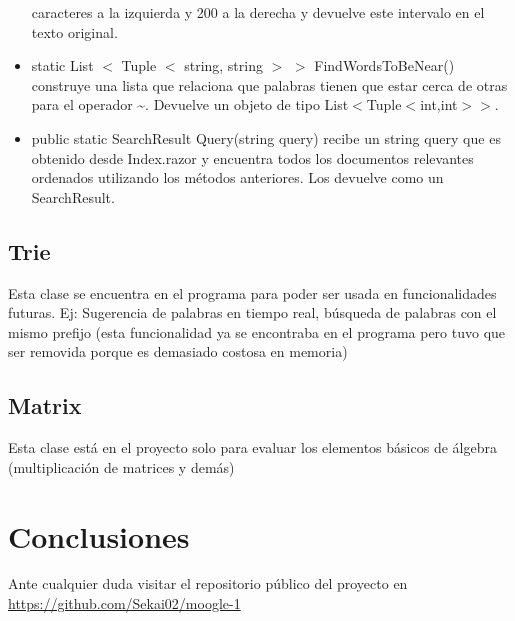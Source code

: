 \documentclass[a4paper,12pt]{article}
\begin{document}
\begin{itemize}
    caracteres a la izquierda y 200 a la derecha y devuelve este intervalo en el texto original.
    \item static List $<$ Tuple $<$ string, string $>$ $>$ FindWordsToBeNear() construye una lista que relaciona que palabras tienen que estar
    cerca de otras para el operador \textasciitilde. Devuelve un objeto de tipo List$<$Tuple$<$int,int$>$$>$.
    \item public static SearchResult Query(string query) recibe un string query que es obtenido desde Index.razor y encuentra todos los
    documentos relevantes ordenados utilizando los métodos anteriores. Los devuelve como
    un SearchResult.
\end{itemize}

\subsection{Trie}\label{sub:trie}
Esta clase se encuentra en el programa para poder ser usada en funcionalidades futuras.
Ej: Sugerencia de palabras en tiempo real, búsqueda de palabras con el mismo prefijo (esta
funcionalidad ya se encontraba en el programa pero tuvo que ser removida porque es demasiado
costosa en memoria)

\subsection{Matrix}\label{sub:matrix}
Esta clase está en el proyecto solo para evaluar los elementos básicos de álgebra (multiplicación de matrices y demás)

\section{Conclusiones}\label{sec:concl}

Ante cualquier duda visitar el repositorio público del proyecto en \url{https://github.com/Sekai02/moogle-1}

\newpage

\tableofcontents

\newpage

\end{document}
